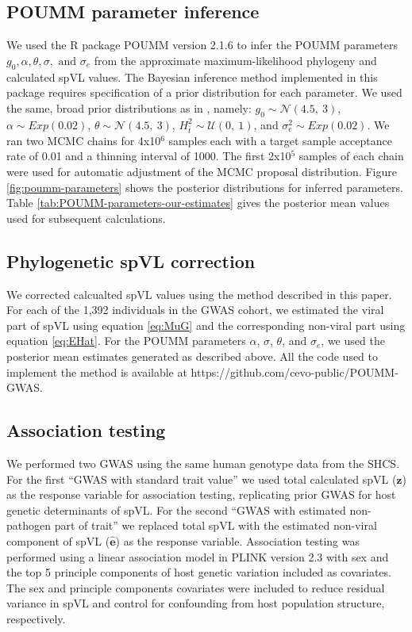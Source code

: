 \documentclass[11pt]{article}
\begin{document}
\begin{linenumbers}
\subsection*{POUMM parameter inference}

We used the R package POUMM version 2.1.6 \citep{Mitov2017a-POUMM} to infer the POUMM parameters $g_0, \alpha, \theta, \sigma, \text{ and }\sigma_e$ from the approximate maximum-likelihood phylogeny and calculated spVL values. The Bayesian inference method implemented in this package requires specification of a prior distribution for each parameter. We used the same, broad prior distributions as in \citet{Mitov2018}, namely: $g_{0} \sim \mathcal{N}(4.5,\ 3)$, $\alpha \sim Exp(0.02)$, $\theta \sim \mathcal{N}(4.5,\ 3)$, $H^2_{\bar{t}} \sim \mathcal{U}(0,\ 1)$, and $\sigma^2_e \sim Exp(0.02)$. We ran two MCMC chains for 4x10$^6$ samples each with a target sample acceptance rate of 0.01 and a thinning interval of 1000. The first 2x10$^5$ samples of each chain were used for automatic adjustment of the MCMC proposal distribution. Figure \ref{fig:poumm-parameters} shows the posterior distributions for inferred parameters. Table \ref{tab:POUMM-parameters-our-estimates} gives the posterior mean values used for subsequent calculations.

\subsection*{Phylogenetic spVL correction}
We corrected calcualted spVL values using the method described in this paper. For each of the 1,392 individuals in the GWAS cohort, we estimated the viral part of spVL using equation \ref{eq:MuG} and the corresponding non-viral part using equation \ref{eq:EHat}. For the POUMM parameters $\alpha$, $\sigma$, $\theta$, and $\sigma_e$, we used the posterior mean estimates generated as described above. All the code used to implement the method is available at https://github.com/cevo-public/POUMM-GWAS.

\subsection*{Association testing}
We performed two GWAS using the same human genotype data from the SHCS. For the first ``GWAS with standard trait value'' we used total calculated spVL ($\bm{z}$) as the response variable for association testing, replicating prior GWAS for host genetic determinants of spVL. For the second ``GWAS with estimated non-pathogen part of trait'' we replaced total spVL with the estimated non-viral component of spVL ($\hat{\bm{e}}$) as the response variable. Association testing was performed using a linear association model in PLINK version 2.3 \citep{Chang2015} with sex and the top 5 principle components of host genetic variation included as covariates. The sex and principle components covariates were included to reduce residual variance in spVL and control for confounding from host population structure, respectively. 


\end{linenumbers}
\end{document}
